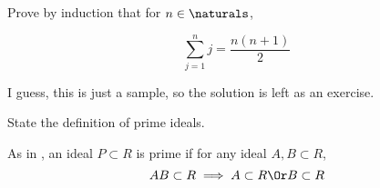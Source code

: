\documentclass{article}
\newcommand{\basedir}{..}
\begin{document}
\integratedtitle
\let\basedir\undefined

\problemsec

Prove by induction that for $n\in\naturals$,

\[
\sum_{j=1}^n j=\frac{n(n+1)}{2}
\]

\begin{solution}
I guess, this is just a sample, so the solution is left as an exercise.
\end{solution}

\problemsec

State the definition of prime ideals.


\begin{solution}
As in \parencite[126]{hungerford}, an ideal $P\subset R$ is prime if for any ideal $A,B \subset R$,
\[
    AB\subset R\implies A\subset R \Or B\subset R
\]
\end{solution}

\printbibliography
\end{document}
